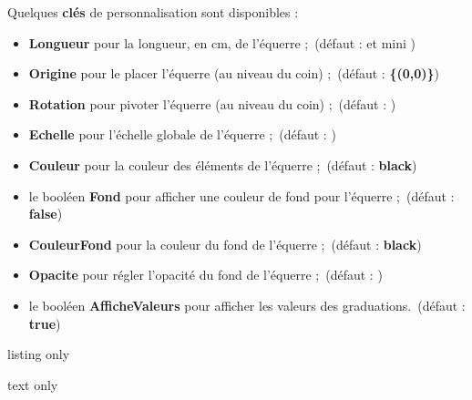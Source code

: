 \documentclass[french,a4paper,11pt]{article}
\newcommand\Cle[1]{{\bfseries\sffamily\textlangle #1\textrangle}}
\newcommand\affichegrille[4]{%
	\draw[xstep=1,ystep=1,lightgray] (#1,#3) grid (#2,#4) ;
	\foreach \x in {#1,\inteval{1+#1},...,#2} \draw[lightgray] (\x,#4)--++(0,3pt) node[font=\scriptsize,above] {$\x$} ;
	\foreach \y in {#3,\inteval{1+#3},...,#4} \draw[lightgray] (#1,\y)--++(-3pt,0) node[font=\scriptsize,left] {$\y$} ;
}
\newcommand\pointsutiles[1]{%
	\foreach \point in {#1} {\draw[thick,fill=red] \point circle[radius=3pt] ;}
}
\begin{document}
\begin{tipblock}
Quelques \Cle{clés} de personnalisation sont disponibles :

\begin{itemize}
	\item \Cle{Longueur} pour la longueur, en cm, de l'équerre ;\hfill~(défaut : \Cle{10} et mini \Cle{4.5})
	\item \Cle{Origine} pour le placer l'équerre (au niveau du coin) ;\hfill~(défaut : \Cle{\{(0,0)\}})
	\item \Cle{Rotation} pour pivoter l'équerre (au niveau du coin) ;\hfill~(défaut : \Cle{0})
	\item \Cle{Echelle} pour l'échelle globale de l'équerre ;\hfill~(défaut : \Cle{1})
	\item \Cle{Couleur} pour la couleur des éléments de l'équerre ;\hfill~(défaut : \Cle{black})
	\item le booléen \Cle{Fond} pour afficher une couleur de fond pour l'équerre ;\hfill~(défaut : \Cle{false})
	\item \Cle{CouleurFond} pour la couleur du fond de l'équerre ;\hfill~(défaut : \Cle{black})
	\item \Cle{Opacite} pour régler l'opacité du fond de l'équerre ;\hfill~(défaut : \Cle{0.5})
	\item le booléen \Cle{AfficheValeurs} pour afficher les valeurs des graduations.\hfill~(défaut : \Cle{true})
\end{itemize}
\vspace*{-\baselineskip}\leavevmode
\end{tipblock}

\begin{PresentationCode}{listing only}
\tkzEquerre[Fond]
\tkzEquerre[Echelle=0.5,Origine={(8,6)},Couleur=DarkBlue,Rotation=-45]
\tkzEquerre[Longueur=10,Origine={(2.5,-1)},Couleur=red,Rotation=-105]
\end{PresentationCode}

\begin{PresentationCode}{text only}
\end{PresentationCode}

\pagebreak
\end{document}
